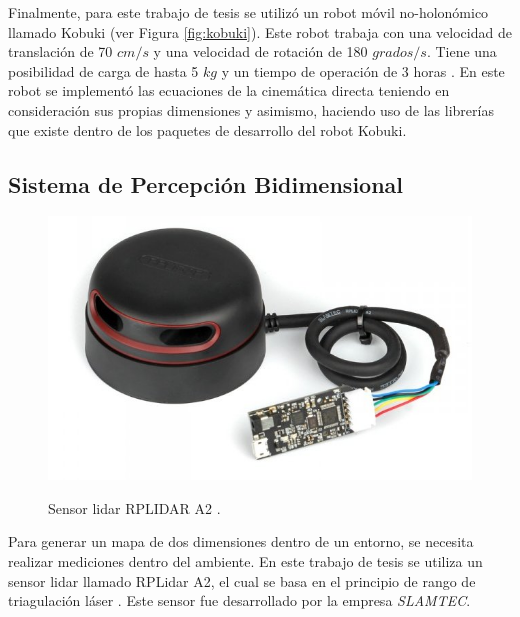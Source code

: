 Finalmente, para este trabajo de tesis se utilizó un robot móvil no-holonómico llamado Kobuki 
(ver Figura \ref{fig:kobuki}). Este robot trabaja con una velocidad de translación de 70 $cm/s$ y 
una velocidad de rotación de 180 $grados/s$. Tiene una posibilidad de carga de hasta 5 $kg$ y un 
tiempo de operación de 3 horas \cite{aboutKobuki}. En este robot se implementó las ecuaciones 
de la cinemática directa teniendo en consideración sus propias dimensiones y asimismo, haciendo
uso de las librerías que existe dentro de los paquetes de desarrollo del robot Kobuki.


\subsection{Sistema de Percepción Bidimensional}
\begin{figure}%
	\centering \footnotesize
 	{\includegraphics[width=0.60\linewidth]{images/rplidar.JPG}}
 	\captionsetup{font=footnotesize}
 	\caption[Sensor lidar RPLIDAR A2.]{Sensor lidar RPLIDAR A2 \cite{sensorLidar}.}
 	\label{f:lidar}
\end{figure}

Para generar un mapa de dos dimensiones dentro de un entorno, se necesita realizar 
mediciones dentro del ambiente. En este trabajo de tesis se utiliza un sensor lidar
llamado RPLidar A2, el cual se basa en el principio de rango de triagulación láser
\cite{amann2001laser}. Este sensor fue desarrollado por la empresa \textit{SLAMTEC}.


